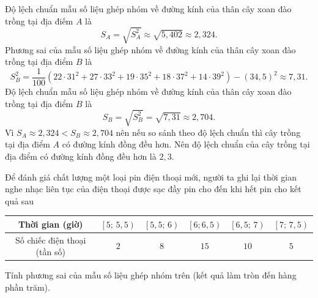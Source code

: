 \begin{bt}
{$$		$$
		Độ lệch chuẩn mẫu số liệu ghép nhóm về đường kính của thân cây xoan đào trồng tại địa điếm $A$ là
		$$
		S_A=\sqrt{S_A^2} \approx \sqrt{5{,}402} \approx 2{,}324.
		$$
		Phương sai của mẫu số liệu ghép nhóm về đường kính của thân cây xoan đào trồng tại địa điểm $B$ là
		$$
		S_B^2=\dfrac{1}{100}\left(22 \cdot 31^2+27 \cdot 33^2+19\cdot 35^2+18 \cdot 37^2+14\cdot 39^2\right)-(34{,}5)^2 \approx 7{,}31.
		$$
		Độ lệch chuẩn mẫu số liệu ghép nhóm về đường kính của thân cây xoan đào trồng tại địa điểm $B$ là
		$$
		S_B=\sqrt{S_B^2}=\sqrt{7{,}31} \approx 2{,}704.
		$$
		Vì $S_A\approx 2{,}324< S_B\approx 2{,}704$ nên nếu so sánh theo độ lệch chuẩn thì cây trồng tại địa điểm $A$ có đường kính đồng đều hơn.
		Nên độ lệch chuẩn của cây trồng tại địa điểm có đường kính đồng đều hơn là $2{,}3$.
	}
\end{bt}

\begin{bt}%

	Để đánh giá chất lượng một loại pin điện thoại mới, người ta ghi lại thời gian nghe nhạc liên tục của điện thoại được sạc đầy pin cho đến khi hết pin cho kết quả sau
	\begin{center}
		\begin{tabular}{|c|c|c|c|c|c|} 
			\hline 
			Thời gian (giờ) & $\left[5;\,5{,}5\right)$ & $\left[5{,}5;\,6\right)$ & $\left[6;6{,}5\right)$ & $\left[6{,}5;\,7\right)$ & $\left[7;\,7{,}5\right)$ \\ 
			\hline 
			Số chiếc điện thoại (tần số) & $2$ & $8$ & $15$ & $10$& $5$\\ 
			\hline 
		\end{tabular}		
	\end{center}
	Tính phương sai của mẫu số liệu ghép nhóm trên (kết quả làm tròn đến hàng phần trăm).
\end{bt}

